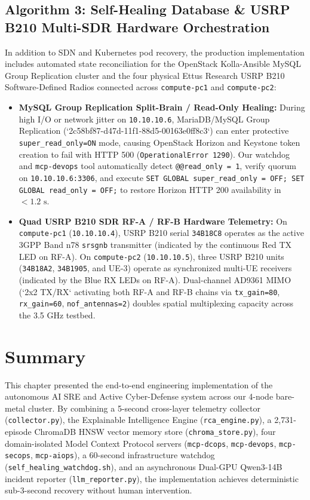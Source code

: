 \subsection*{Algorithm 3: Self-Healing Database & USRP B210 Multi-SDR Hardware Orchestration}
In addition to SDN and Kubernetes pod recovery, the production implementation includes automated state reconciliation for the OpenStack Kolla-Ansible MySQL Group Replication cluster and the four physical Ettus Research USRP B210 Software-Defined Radios connected across \texttt{compute-pc1} and \texttt{compute-pc2}:
\begin{itemize}
    \item \textbf{MySQL Group Replication Split-Brain / Read-Only Healing:} During high I/O or network jitter on \texttt{10.10.10.6}, MariaDB/MySQL Group Replication (`2c58bf87-d47d-11f1-88d5-00163e0ff8c3`) can enter protective \texttt{super\_read\_only=ON} mode, causing OpenStack Horizon and Keystone token creation to fail with HTTP 500 (\texttt{OperationalError 1290}). Our watchdog and \texttt{mcp-devops} tool automatically detect \texttt{@@read\_only = 1}, verify quorum on \texttt{10.10.10.6:3306}, and execute \texttt{SET GLOBAL super\_read\_only = OFF; SET GLOBAL read\_only = OFF;} to restore Horizon HTTP 200 availability in $<1.2\text{ s}$.
    \item \textbf{Quad USRP B210 SDR RF-A / RF-B Hardware Telemetry:} On \texttt{compute-pc1} (\texttt{10.10.10.4}), USRP B210 serial \texttt{34B18C8} operates as the active 3GPP Band n78 \texttt{srsgnb} transmitter (indicated by the continuous Red TX LED on RF-A). On \texttt{compute-pc2} (\texttt{10.10.10.5}), three USRP B210 units (\texttt{34B18A2}, \texttt{34B1905}, and UE-3) operate as synchronized multi-UE receivers (indicated by the Blue RX LEDs on RF-A). Dual-channel AD9361 MIMO (`2x2 TX/RX` activating both RF-A and RF-B chains via \texttt{tx\_gain=80}, \texttt{rx\_gain=60}, \texttt{nof\_antennas=2}) doubles spatial multiplexing capacity across the 3.5 GHz testbed.
\end{itemize}

\section{Summary}
This chapter presented the end-to-end engineering implementation of the autonomous AI SRE and Active Cyber-Defense system across our 4-node bare-metal cluster. By combining a 5-second cross-layer telemetry collector (\texttt{collector.py}), the Explainable Intelligence Engine (\texttt{rca\_engine.py}), a 2,731-episode ChromaDB HNSW vector memory store (\texttt{chroma\_store.py}), four domain-isolated Model Context Protocol servers (\texttt{mcp-dcops}, \texttt{mcp-devops}, \texttt{mcp-secops}, \texttt{mcp-aiops}), a 60-second infrastructure watchdog (\texttt{self\_healing\_watchdog.sh}), and an asynchronous Dual-GPU Qwen3-14B incident reporter (\texttt{llm\_reporter.py}), the implementation achieves deterministic sub-3-second recovery without human intervention.


